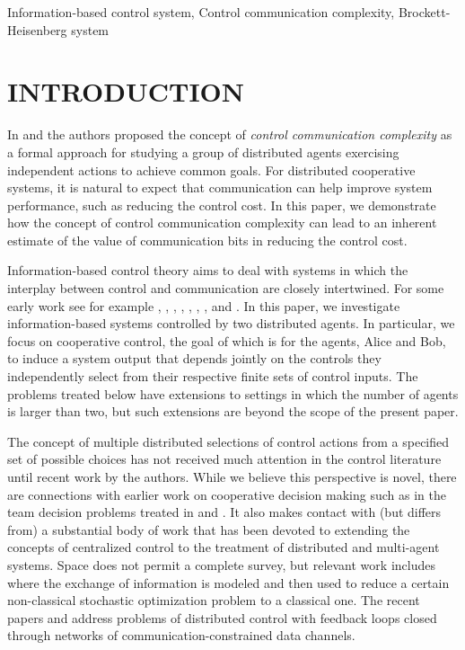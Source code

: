 \documentclass[12pt,onecolumn,draftcls]{IEEEtran}
\begin{document}
\begin{IEEEkeywords}
\noindent
Information-based control system, Control communication complexity, Brockett-Heisenberg system
\end{IEEEkeywords}



\section{INTRODUCTION}\setcounter{equation}{0}

In \cite{Wong} and \cite{WB} the authors proposed the concept of {\normalsize\em control  communication complexity}
as a formal approach for studying a group of distributed agents exercising independent actions to achieve common goals.  For distributed cooperative systems, it is natural to expect that communication can help improve system performance, such as reducing the control cost.  In this paper, we demonstrate how the concept of control communication complexity can lead to an inherent estimate of the value of communication bits in reducing the control cost.  

Information-based control theory aims to deal with systems in which the interplay between control and communication are closely intertwined.
For some early work see for example \cite{De}, \cite{WBr1}, \cite{WBr2}, \cite{EM}, \cite{FZ}, \cite{LB}, \cite{NE}, and \cite{TM}.
In this paper, we investigate information-based systems controlled by two distributed agents.  In particular, we focus on cooperative control, the goal of which is for the agents, Alice and Bob,
to induce a system output that depends jointly on the controls they independently select from their respective finite sets of control inputs.  The problems treated below have extensions to settings in which the number of agents is larger than two, but such extensions are beyond the scope of the present paper.

The concept of multiple distributed selections of control actions from a specified set of possible choices has  not received much attention in the control literature until recent
work by the authors.  
While we believe this perspective
is novel, there are connections
with earlier work on cooperative decision making such as in the team decision problems treated in  \cite{YCHo} and \cite{AW}.  It also makes contact with (but differs from) a substantial body of work that has been devoted to extending the concepts of centralized control to the treatment of distributed and multi-agent systems.  Space does not permit a complete survey, but relevant work includes \cite{Yuksel} where the exchange of information is modeled and then used to reduce a certain non-classical stochastic optimization problem to a classical one.  The recent papers \cite{YB} and \cite{MS} address problems of distributed control with feedback loops closed through networks of communication-constrained data channels.
\end{document}
